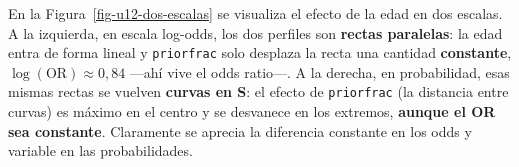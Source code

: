 \documentclass[
  letterpaper,
  DIV=11,
  numbers=noendperiod]{scrartcl}
\newenvironment{Shaded}{\begin{snugshade}}{\end{snugshade}}
\newcommand{\AttributeTok}[1]{\textcolor[rgb]{0.40,0.45,0.13}{#1}}
\newcommand{\CommentTok}[1]{\textcolor[rgb]{0.37,0.37,0.37}{#1}}
\newcommand{\ConstantTok}[1]{\textcolor[rgb]{0.56,0.35,0.01}{#1}}
\newcommand{\DecValTok}[1]{\textcolor[rgb]{0.68,0.00,0.00}{#1}}
\newcommand{\FloatTok}[1]{\textcolor[rgb]{0.68,0.00,0.00}{#1}}
\newcommand{\FunctionTok}[1]{\textcolor[rgb]{0.28,0.35,0.67}{#1}}
\newcommand{\NormalTok}[1]{\textcolor[rgb]{0.00,0.23,0.31}{#1}}
\newcommand{\OtherTok}[1]{\textcolor[rgb]{0.00,0.23,0.31}{#1}}
\newcommand{\SpecialCharTok}[1]{\textcolor[rgb]{0.37,0.37,0.37}{#1}}
\newcommand{\StringTok}[1]{\textcolor[rgb]{0.13,0.47,0.30}{#1}}
\begin{document}
En la Figura~\ref{fig-u12-dos-escalas} se visualiza el efecto de la edad
en dos escalas. A la izquierda, en escala log-odds, los dos perfiles son
\textbf{rectas paralelas}: la edad entra de forma lineal y
\texttt{priorfrac} solo desplaza la recta una cantidad
\textbf{constante}, \(\log(\text{OR})\approx 0{,}84\) ---ahí vive el
odds ratio---. A la derecha, en probabilidad, esas mismas rectas se
vuelven \textbf{curvas en S}: el efecto de \texttt{priorfrac} (la
distancia entre curvas) es máximo en el centro y se desvanece en los
extremos, \textbf{aunque el OR sea constante}. Claramente se aprecia la
diferencia constante en los odds y variable en las probabilidades.

\begin{Shaded}
\end{Shaded}
\end{document}
